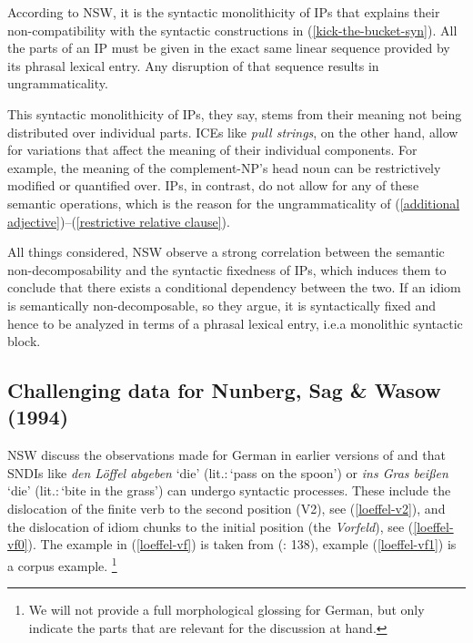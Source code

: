 \documentclass[output=paper]{langsci/langscibook}
\begin{document}
According to NSW, it is the syntactic monolithicity of IPs that explains their non-compatibility with the syntactic constructions in (\ref{kick-the-bucket-syn}). All the parts of an IP must be given in the exact same linear sequence provided by its phrasal lexical entry. Any disruption of that sequence results in ungrammaticality.

This syntactic monolithicity of IPs, they say, stems from their meaning not being distributed over individual parts. ICEs like \textit{pull strings}, on the other hand, allow for variations that affect the meaning of their individual components. For example, the meaning of the complement-NP's head noun can be restrictively modified or quantified over. 
IPs, in contrast, do not allow for any of these semantic operations, which is the reason for the ungrammaticality of (\ref{additional adjective})--(\ref{restrictive relative clause}).

All things considered, NSW observe a strong correlation between the semantic non-decomposability and the syntactic fixedness of IPs, which induces them to conclude that there exists a conditional dependency between the two. If an idiom is semantically non-decomposable, so they argue, it is syntactically fixed and hence to be analyzed in terms of a phrasal lexical entry, i.e.\@ a monolithic syntactic block.



\subsection{Challenging data for Nunberg, Sag \& Wasow (1994)}


NSW discuss the observations made for  German in earlier versions of \cite{Schenk:95} and \cite{Webelhuth:Ackermann:99} that SNDIs like \textit{den L\"offel abgeben} `die' (lit.:\,`pass on the spoon') or \textit{ins Gras bei{\ss}en} `die' (lit.:\,`bite in the grass') can undergo syntactic processes.
These include 
 the dislocation of the finite verb to the second position (V2), see (\ref{loeffel-v2}), 
and 
 the dislocation of idiom chunks to the initial position (the \textit{Vorfeld}), see (\ref{loeffel-vf0}). The example in (\ref{loeffel-vf}) is taken from \citeauthor{Trotzke:Zwart:14} (\citeyear{Trotzke:Zwart:14}: 138), example (\ref{loeffel-vf1}) is a corpus example.%
\footnote{We will not provide a full morphological glossing for German, but only indicate the parts that are relevant for the discussion at hand.
}
\end{document}
